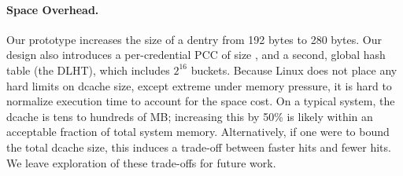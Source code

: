 \begin{table}[t]
\end{table}




\paragraph{Space Overhead.}
Our prototype increases the size of a dentry from 192 bytes to 280 bytes.
Our design also introduces a per-credential PCC of size \PCCsize{}, 
and a second, global hash table (the DLHT),
which includes $2^{16}$ buckets.
Because Linux does not place any hard limits on dcache size, except extreme under memory pressure, 
it is hard to normalize execution time to account for the space cost.
On a typical system, the dcache is tens to hundreds of MB; increasing this by 50\% is likely within an acceptable 
fraction of total system memory.
Alternatively, if one were to bound the total dcache size, this induces
a trade-off between faster hits and fewer hits.  
We leave exploration of these trade-offs for future work.


